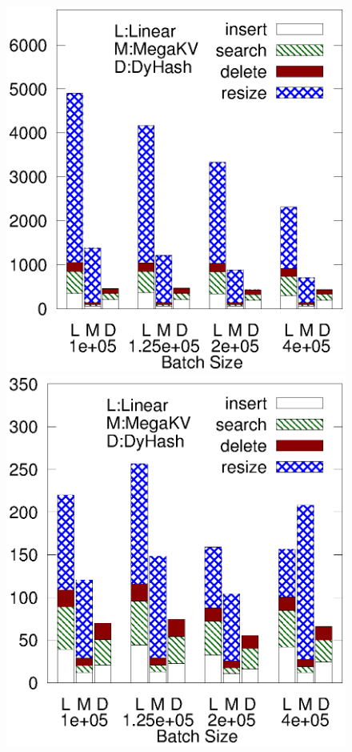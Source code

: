 \begin{figure}[htp]
\begin{minipage}{0.19\linewidth}
		\centerline{\dsreddit}
	\end{minipage}
	\begin{minipage}{0.19\linewidth}\centering
		\includegraphics[width=\linewidth]{pic/dynamic/tpch/diff_batch_size.eps}
		\centerline{\dstpch}
	\end{minipage}
	\begin{minipage}{0.19\linewidth}\centering
		\includegraphics[width=\linewidth]{pic/dynamic/ali/diff_batch_size.eps}

\end{minipage}
\end{figure}
